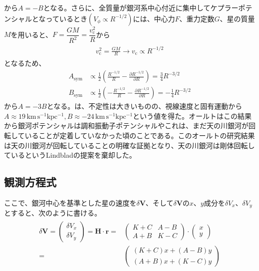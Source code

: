 から$A=-B$となる。さらに、全質量が銀河系中心付近に集中してケプラーポテンシャルとなっているとき$(V_{\phi} \propto R^{-1/2})$には、中心力$F$、重力定数$G$、星の質量$M$を用いると、$F = \dfrac{GM}{R^2} = \dfrac{v_{\mathrm{c}}^2}{R}$から
\begin{align}
\begin{aligned}
    v_{\mathrm{c}}^2 = \frac{GM}{R} \to v_{\mathrm{c}} \propto R^{-1/2}
\end{aligned}
\end{align}
となるため、
\begin{subequations}
\begin{align}
	A_{\mathrm{sym}} &\propto \frac{1}{2}\left( \frac{R^{-1/2}}{R} - \frac{\partial R^{-1/2}}{\partial R} \right) = \frac{3}{4}R^{-3/2}\\
	B_{\mathrm{sym}} &\propto \frac{1}{2}\left( -\frac{R^{-1/2}}{R} - \frac{\partial R^{-1/2}}{\partial R} \right) = -\frac{1}{4}R^{-3/2}
\end{align}
\end{subequations}
から$A=-3B$となる。\cite{Oort1927b}は、不定性は大きいものの、視線速度と固有運動から$A\approx 19\,\mathrm{km\,s^{-1} kpc^{-1}}, B\approx -24\,\mathrm{km\,s^{-1} kpc^{-1}}$という値を得た。オールトはこの結果から銀河ポテンシャルは調和振動子ポテンシャルやこれは、まだ天の川銀河が回転していることが定着していなかった頃のことである。このオールトの研究結果は天の川銀河が回転していることの明確な証拠となり、天の川銀河は剛体回転しているというLindbladの提案を棄却した。



\subsection{観測方程式}
ここで、銀河中心を基準とした星の速度を$\delta\pmb{V}$、そして$\delta\pmb{V}$の$x、y$成分を$\delta V_x、\delta V_y$とすると、次のように書ける。
\begin{align}
\begin{aligned}
	\delta\pmb{V} =
	\left(
	\begin{array}{c}
	 	\delta V_x\\
		\delta V_y
	\end{array}
	\right)
	=
	\pmb{H} \cdot \pmb{r}
	=&
	\left(
	\begin{array}{cc}
	 	K+C & A-B\\
		A+B & K-C
	\end{array}
	\right)
	\cdot
	\left(
	\begin{array}{c}
	 	x\\
		y
	\end{array}
	\right)\\
	=&
	\left(
	\begin{array}{c}
	 	(K+C)x + (A-B)y\\
		(A+B)x + (K-C)y
	\end{array}
	\right)
\end{aligned} \label{eq266}
\end{align}

